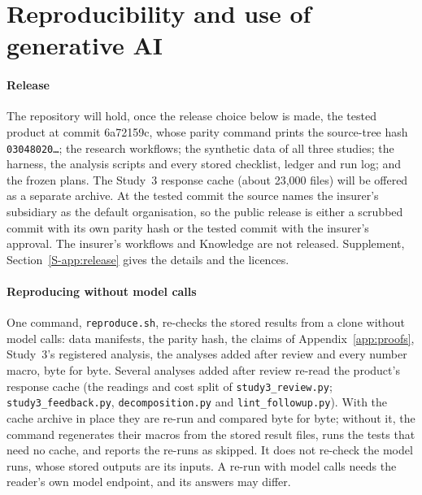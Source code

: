 \section{Reproducibility and use of generative AI}
\label{app:repro}
\label{app:release}
\label{app:genai}

\paragraph{Release}
The repository \cite{casepath2026repo} will hold, once the release choice below is made, the tested product at commit 6a72159c, whose parity command prints the source-tree hash \texttt{03048020\ldots}; the research workflows; the synthetic data of all three studies; the harness, the analysis scripts and every stored checklist, ledger and run log; and the frozen plans. The Study~3 response cache (about 23,000 files) will be offered as a separate archive. At the tested commit the source names the insurer's subsidiary as the default organisation, so the public release is either a scrubbed commit with its own parity hash or the tested commit with the insurer's approval. The insurer's workflows and Knowledge are not released. Supplement, Section~\ref{S-app:release} gives the details and the licences.

\paragraph{Reproducing without model calls}
One command, \texttt{reproduce.sh}, re-checks the stored results from a clone without model calls: data manifests, the parity hash, the claims of Appendix~\ref{app:proofs}, Study~3's registered analysis, the analyses added after review and every number macro, byte for byte. Several analyses added after review re-read the product's response cache (the readings and cost split of \texttt{study3\_review.py}; \texttt{study3\_feedback.py}, \texttt{decomposition.py} and \texttt{lint\_followup.py}). With the cache archive in place they are re-run and compared byte for byte; without it, the command regenerates their macros from the stored result files, runs the tests that need no cache, and reports the re-runs as skipped. It does not re-check the model runs, whose stored outputs are its inputs. A re-run with model calls needs the reader's own model endpoint, and its answers may differ.

